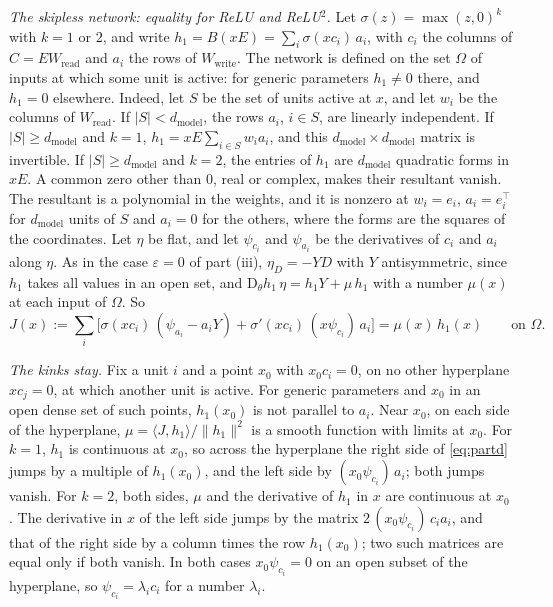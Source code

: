 \documentclass[10pt]{article}
\theoremstyle{definition}
\theoremstyle{remark}
\newcommand{\Wread}{W_{\mathrm{read}}}
\newcommand{\Wwrite}{W_{\mathrm{write}}}
\newcommand{\dm}{d_{\mathrm{model}}}
\newcommand{\Der}{\mathrm{D}}
\newcommand{\norm}[1]{\lVert #1\rVert}
\begin{document}
\emph{The skipless network: equality for ReLU and ReLU$^2$.} Let $\sigma(z) = \max(z, 0)^k$ with $k = 1$ or $2$, and write $h_1 = B(xE) = \sum_i \sigma(xc_i)\,a_i$, with $c_i$ the columns of $C = E\Wread$ and $a_i$ the rows of $\Wwrite$. The network is defined on the set $\Omega$ of inputs at which some unit is active: for generic parameters $h_1 \neq 0$ there, and $h_1 = 0$ elsewhere. Indeed, let $S$ be the set of units active at $x$, and let $w_i$ be the columns of $\Wread$. If $\lvert S\rvert < \dm$, the rows $a_i$, $i \in S$, are linearly independent. If $\lvert S\rvert \ge \dm$ and $k = 1$, $h_1 = xE\sum_{i\in S}w_ia_i$, and this $\dm\times\dm$ matrix is invertible. If $\lvert S\rvert \ge \dm$ and $k = 2$, the entries of $h_1$ are $\dm$ quadratic forms in $xE$. A common zero other than $0$, real or complex, makes their resultant vanish. The resultant is a polynomial in the weights, and it is nonzero at $w_i = e_i$, $a_i = e_i^\top$ for $\dm$ units of $S$ and $a_i = 0$ for the others, where the forms are the squares of the coordinates. Let $\eta$ be flat, and let $\psi_{c_i}$ and $\psi_{a_i}$ be the derivatives of $c_i$ and $a_i$ along $\eta$. As in the case $\varepsilon = 0$ of part (iii), $\eta_D = -YD$ with $Y$ antisymmetric, since $h_1$ takes all values in an open set, and $\Der_\theta h_1\,\eta = h_1Y + \mu\,h_1$ with a number $\mu(x)$ at each input of $\Omega$. So
\begin{equation}\label{eq:partd}
J(x) := \sum_i\Big[\sigma(xc_i)\,(\psi_{a_i} - a_iY) + \sigma'(xc_i)\,(x\psi_{c_i})\,a_i\Big] = \mu(x)\,h_1(x) \qquad\text{on } \Omega.
\end{equation}

\emph{The kinks stay.} Fix a unit $i$ and a point $x_0$ with $x_0c_i = 0$, on no other hyperplane $xc_j = 0$, at which another unit is active. For generic parameters and $x_0$ in an open dense set of such points, $h_1(x_0)$ is not parallel to $a_i$. Near $x_0$, on each side of the hyperplane, $\mu = \langle J, h_1\rangle/\norm{h_1}^2$ is a smooth function with limits at $x_0$. For $k = 1$, $h_1$ is continuous at $x_0$, so across the hyperplane the right side of \cref{eq:partd} jumps by a multiple of $h_1(x_0)$, and the left side by $(x_0\psi_{c_i})\,a_i$; both jumps vanish. For $k = 2$, both sides, $\mu$ and the derivative of $h_1$ in $x$ are continuous at $x_0$. The derivative in $x$ of the left side jumps by the matrix $2\,(x_0\psi_{c_i})\,c_ia_i$, and that of the right side by a column times the row $h_1(x_0)$; two such matrices are equal only if both vanish. In both cases $x_0\psi_{c_i} = 0$ on an open subset of the hyperplane, so $\psi_{c_i} = \lambda_ic_i$ for a number $\lambda_i$.
\end{document}
